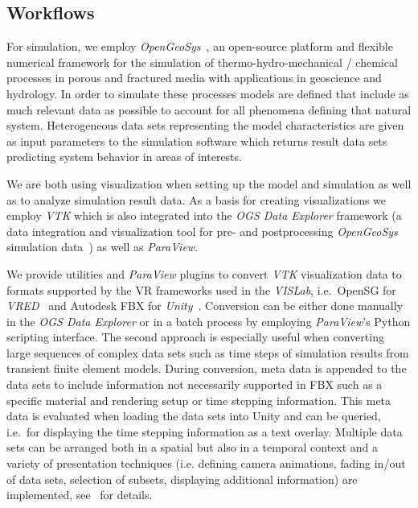 \documentclass[twocolumn]{svjour3}          %
\begin{document}
\subsection{Workflows}
\label{workflows}

For simulation, we employ \emph{OpenGeoSys}~\cite{kolditz:ogs}, an open-source platform and flexible numerical framework for the simulation of thermo-hydro-mechanical / chemical processes in porous and fractured media with applications in geoscience and hydrology. In order to simulate these processes models are defined that include as much relevant data as possible to account for all phenomena defining that natural system. Heterogeneous data sets representing the model characteristics are given as input parameters to the simulation software which returns result data sets predicting system behavior in areas of interests.

We are both using visualization when setting up the model and simulation as well as to analyze simulation result data. As a basis for creating visualizations we employ \emph{VTK} which is also integrated into the \emph{OGS Data Explorer} framework (a data integration and visualization tool for pre- and postprocessing \emph{OpenGeoSys} simulation data~\cite{rink:eesenvirvis}) as well as \emph{ParaView}.

We provide utilities and \emph{ParaView} plugins to convert \emph{VTK} visualization data to formats supported by the VR frameworks used in the \emph{VISLab}, i.e.~OpenSG for \emph{VRED}~\cite{bilke:vtkosgconverter} and Autodesk FBX for \emph{Unity}~\cite{bilke:vtkfbxconverter}. Conversion can be either done manually in the \emph{OGS Data Explorer} or in a batch process by employing \emph{ParaView}'s Python scripting interface. The second approach is especially useful when converting large sequences of complex data sets such as time steps of simulation results from transient finite element models. During conversion, meta data is appended to the data sets to include information not necessarily supported in FBX such as a specific material and rendering setup or time stepping information. This meta data is evaluated when loading the data sets into Unity and can be queried, i.e.~for displaying the time stepping information as a text overlay. Multiple data sets can be arranged both in a spatial but also in a temporal context and a variety of presentation techniques (i.e. defining camera animations, fading in/out of data sets, selection of subsets, displaying additional information) are implemented, see~\cite{rink:eesenvirvis} for details.
\end{document}
